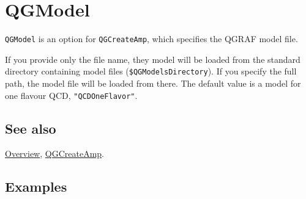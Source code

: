 \documentclass[../FeynHelpersManual.tex]{subfiles}
\begin{document}
\hypertarget{qgmodel}{
\section{QGModel}\label{qgmodel}}

\texttt{QGModel} is an option for \texttt{QGCreateAmp}, which specifies
the QGRAF model file.

If you provide only the file name, they model will be loaded from the
standard directory containing model files
(\texttt{\$QGModelsDirectory}). If you specify the full path, the model
file will be loaded from there. The default value is a model for one
flavour QCD, \texttt{"QCDOneFlavor"}.

\subsection{See also}

\hyperlink{toc}{Overview}, \hyperlink{qgcreateamp}{QGCreateAmp}.

\subsection{Examples}
\end{document}
